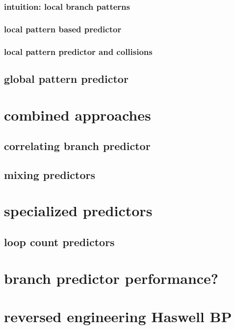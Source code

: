 \subsubsection{intuition: local branch patterns}

\subsubsection{local pattern based predictor}


\subsubsection{local pattern predictor and collisions}


\subsection{global pattern predictor}
 

\section{combined approaches}

\subsection{correlating branch predictor}

\subsection{mixing predictors}


\section{specialized predictors}
\subsection{loop count predictors}


\section{branch predictor performance?}


\section{reversed engineering Haswell BP}



